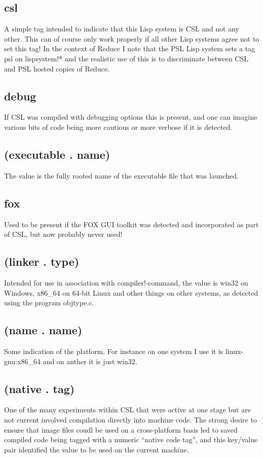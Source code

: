 \documentclass[a4paper,11pt]{article}
\begin{document}
\subsection{\ttfamily csl}
A simple tag intended to indicate that this Lisp system is CSL and not any
other. This can of course only work properly if all other Lisp systems
agree not to set this tag! In the context of Reduce I note that the PSL
Lisp system sets a tag {\ttfamily psl} on {\ttfamily lispsystem!*} and
the realistic use of this is to discriminate between CSL and PSL hosted
copies of Reduce.
\subsection{\ttfamily debug}
If CSL was compiled with debugging options this is present, and one can imagine
various bits of code being more cautious or more verbose if it is detected.
\subsection{\ttfamily (executable . name)}
The value is the fully rooted name of the executable file that was launched.
\subsection{\ttfamily fox}
Used to be present if the FOX GUI toolkit was detected and incorporated as
part of CSL, but now probably never used!
\subsection{\ttfamily (linker . type)}
Intended for use in association with {\ttfamily compiler!-command}, the value
is {\ttfamily win32} on Windows, {\ttfamily x86\_64} on 64-bit Linux and
other things on other systems, as detected using the program {\ttfamily
objtype.c}.
\subsection{\ttfamily (name . name)}
Some indication of the platform. For instance on one system I use it
is {\ttfamily linux-gnu:x86\_64} and on anther it is just {\ttfamily win32}.
\subsection{\ttfamily (native . tag)}
One of the many experiments within CSL that were active at one stage but are
not current involved compilation directly into machine code. The strong
desire to ensure that image files coudl be used on a cross-platform basis
led to saved compiled code being tagged with a numeric ``native code tag'',
and this key/value pair identified the value to be used on the current
machine.
\end{document}

